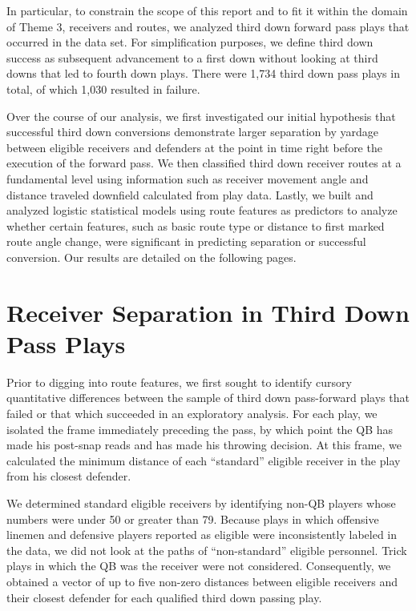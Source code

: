 \documentclass[12pt,letterpaper]{article}
\begin{document}
In particular, to constrain the scope of this report and to fit it within the domain of Theme 3, receivers and routes, we analyzed third down forward pass plays that occurred in the data set. For simplification purposes, we define third down success as subsequent advancement to a first down without looking at third downs that led to fourth down plays. There were 1,734 third down pass plays in total, of which 1,030 resulted in failure.

Over the course of our analysis, we first investigated our initial hypothesis that successful third down conversions demonstrate larger separation by yardage between eligible receivers and defenders at the point in time right before the execution of the forward pass. We then classified third down receiver routes at a fundamental level using information such as receiver movement angle and distance traveled downfield calculated from play data. Lastly, we built and analyzed logistic statistical models using route features as predictors to analyze whether certain features, such as basic route type or distance to first marked route angle change, were significant in predicting separation or successful conversion. Our results are detailed on the following pages.

\section*{Receiver Separation in Third Down Pass Plays}

Prior to digging into route features, we first sought to identify cursory quantitative differences between the sample of third down pass-forward plays that failed or that which succeeded in an exploratory analysis. For each play, we isolated the frame immediately preceding the pass, by which point the QB has made his post-snap reads and has made his throwing decision. At this frame, we calculated the minimum distance of each ``standard'' eligible receiver in the play from his closest defender. 

We determined standard eligible receivers by identifying non-QB players whose numbers were under 50 or greater than 79. Because plays in which offensive linemen and defensive players reported as eligible were inconsistently labeled in the data, we did not look at the paths of ``non-standard'' eligible personnel. Trick plays in which the QB was the receiver were not considered. Consequently, we obtained a vector of up to five non-zero distances between eligible receivers and their closest defender for each qualified third down passing play.       
\end{document}
